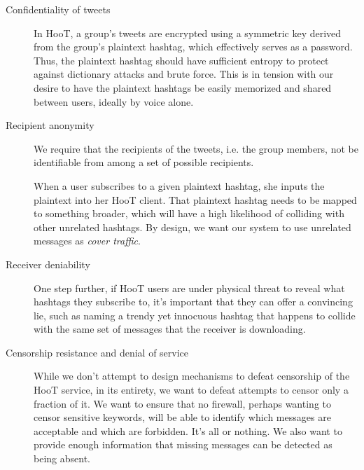 \begin{description}

\item[Confidentiality of tweets] In HooT, a group's tweets are encrypted
  using a symmetric key derived from the group's plaintext hashtag,
  which effectively serves as a password. Thus, the plaintext hashtag
  should have sufficient entropy to protect against dictionary attacks
  and brute force. This is in tension with our desire to have the
  plaintext hashtags be easily memorized and shared between users,
  ideally by voice alone.

\item[Recipient anonymity] We require that the recipients of the tweets,
  i.e. the group members, not be identifiable from among a set of
  possible recipients.

When a user subscribes to a given plaintext
  hashtag, she inputs the plaintext into her HooT client. That
  plaintext hashtag needs to be mapped to something broader, which will
  have a high likelihood of colliding with other unrelated hashtags. By
  design, we want our system to use unrelated messages as {\em cover
    traffic}.

\item[Receiver deniability] One step further, if HooT users are under
  physical threat to reveal what hashtags they subscribe to, it's
  important that they can offer a convincing lie, such as naming a
  trendy yet innocuous hashtag that happens to collide with the same set
  of messages that the receiver is downloading.

\item[Censorship resistance and denial of service] While we don't
  attempt to design mechanisms to defeat censorship of the HooT service,
  in its entirety, we want to defeat attempts to censor only a fraction
  of it. We want to ensure that no firewall, perhaps wanting to censor
  sensitive keywords, will be able to identify which messages are
  acceptable and which are forbidden. It's all or nothing. We also want
  to provide enough information that missing messages can be detected as
  being absent.


\end{description}
